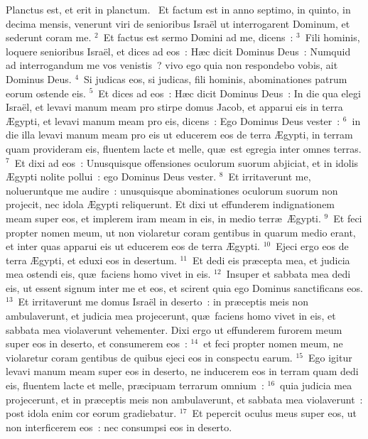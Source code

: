  Planctus est, et erit in planctum.
~Et factum est in anno septimo, in quinto, in decima mensis, venerunt viri de senioribus Isra\"el ut interrogarent Dominum, et sederunt coram me.
${}^{2}$~Et factus est sermo Domini ad me, dicens~:
${}^{3}$~Fili hominis, loquere senioribus Isra\"el, et dices ad eos~: H\ae c dicit Dominus Deus~: Numquid ad interrogandum me vos venistis~? vivo ego quia non respondebo vobis, ait Dominus Deus.
${}^{4}$~Si judicas eos, si judicas, fili hominis, abominationes patrum eorum ostende eis.
${}^{5}$~Et dices ad eos~: H\ae c dicit Dominus Deus~: In die qua elegi Isra\"el, et levavi manum meam pro stirpe domus Jacob, et apparui eis in terra \AE gypti, et levavi manum meam pro eis, dicens~: Ego Dominus Deus vester~:
${}^{6}$~in die illa levavi manum meam pro eis ut educerem eos de terra \AE gypti, in terram quam provideram eis, fluentem lacte et melle, qu\ae\ est egregia inter omnes terras.
${}^{7}$~Et dixi ad eos~: Unusquisque offensiones oculorum suorum abjiciat, et in idolis \AE gypti nolite pollui~: ego Dominus Deus vester.
${}^{8}$~Et irritaverunt me, nolueruntque me audire~: unusquisque abominationes oculorum suorum non projecit, nec idola \AE gypti reliquerunt. Et dixi ut effunderem indignationem meam super eos, et implerem iram meam in eis, in medio terr\ae\ \AE gypti.
${}^{9}$~Et feci propter nomen meum, ut non violaretur coram gentibus in quarum medio erant, et inter quas apparui eis ut educerem eos de terra \AE gypti.
${}^{10}$~Ejeci ergo eos de terra \AE gypti, et eduxi eos in desertum.
${}^{11}$~Et dedi eis pr\ae cepta mea, et judicia mea ostendi eis, qu\ae\ faciens homo vivet in eis.
${}^{12}$~Insuper et sabbata mea dedi eis, ut essent signum inter me et eos, et scirent quia ego Dominus sanctificans eos.
${}^{13}$~Et irritaverunt me domus Isra\"el in deserto~: in pr\ae ceptis meis non ambulaverunt, et judicia mea projecerunt, qu\ae\ faciens homo vivet in eis, et sabbata mea violaverunt vehementer. Dixi ergo ut effunderem furorem meum super eos in deserto, et consumerem eos~:
${}^{14}$~et feci propter nomen meum, ne violaretur coram gentibus de quibus ejeci eos in conspectu earum.
${}^{15}$~Ego igitur levavi manum meam super eos in deserto, ne inducerem eos in terram quam dedi eis, fluentem lacte et melle, pr\ae cipuam terrarum omnium~:
${}^{16}$~quia judicia mea projecerunt, et in pr\ae ceptis meis non ambulaverunt, et sabbata mea violaverunt~: post idola enim cor eorum gradiebatur.
${}^{17}$~Et pepercit oculus meus super eos, ut non interficerem eos~: nec consumpsi eos in deserto.
